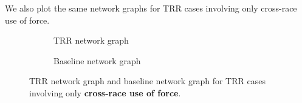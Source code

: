 \documentclass[10pt]{article}
\begin{document}
We also plot the same network graphs for TRR cases involving only cross-race use of force.

\begin{figure}
\captionsetup{font=small}
    \begin{subfigure}{0.5\textwidth}
        \caption{TRR network graph}
        \label{trr_cross_race}
    \end{subfigure}%
    \begin{subfigure}{0.5\textwidth}
        \caption{Baseline network graph}
        \label{baseline_cross_race}
    \end{subfigure}
\caption{TRR network graph and baseline network graph for TRR cases involving only \textbf{cross-race use of force}.}
\end{figure}
\end{document}
